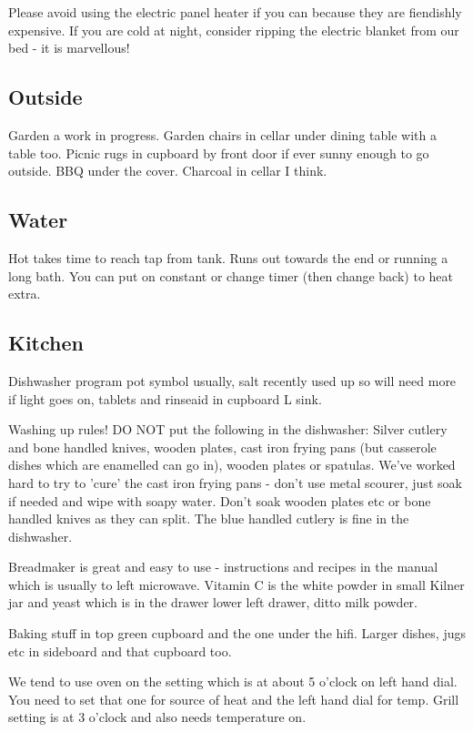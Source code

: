 \documentclass[11pt]{article}
\begin{document}
Please avoid using the electric panel heater if you can because they are fiendishly expensive. If you are cold at night, consider ripping the electric blanket from our bed - it is marvellous!

\subsection*{Outside}
Garden a work in progress.  Garden chairs in cellar under dining table with a table too. Picnic rugs in cupboard by front door if ever sunny enough to go outside.  BBQ under the cover. Charcoal in cellar I think.  

\subsection*{Water}
Hot takes time to reach tap from tank. Runs out towards the end or running a long bath. You can put on constant or change timer (then change back) to heat extra.


\subsection*{Kitchen}
Dishwasher program pot symbol usually, salt recently used up so will need more if light goes on, tablets and rinseaid in cupboard L sink.

Washing up rules! DO NOT put the following in the dishwasher: Silver cutlery and bone handled knives, wooden plates, cast iron frying pans (but casserole dishes which are enamelled can go in), wooden plates or spatulas.  We've worked hard to try to 'cure' the cast iron frying pans - don't use metal scourer, just soak if needed and wipe with soapy water.  Don't soak wooden plates etc or bone handled knives as they can split.  The blue handled cutlery is fine in the dishwasher.  

Breadmaker is great and easy to use - instructions and recipes in the manual which is usually to left microwave.  Vitamin C is the white powder in small Kilner jar and yeast which is in the drawer lower left drawer, ditto milk powder.

Baking stuff in top green cupboard and the one under the hifi.  Larger dishes, jugs etc in sideboard and that cupboard too.

We tend to use oven on the setting which is at about 5 o'clock on left hand dial.  You need to set that one for source of heat and the left hand dial for temp.  Grill setting is at 3 o'clock and also needs temperature on. 
\end{document}
